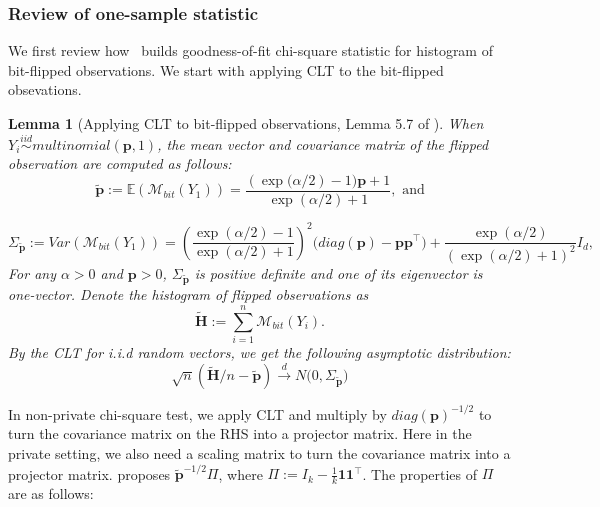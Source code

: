 \documentclass[11pt]{article} %
\newtheorem{lemma}{Lemma}[section]
\begin{document}
\subsubsection{Review of one-sample statistic}
We first review how~\citet{Gaboardi2018LDPChisq} builds goodness-of-fit chi-square statistic for  histogram of bit-flipped observations.
We start with applying CLT to the bit-flipped obsevations. 
\begin{lemma}[Applying CLT to bit-flipped observations, Lemma 5.7 of \cite{Gaboardi2018LDPChisq}]\label{lemma_57}
When $Y_i \stackrel{iid}{\sim} multinomial(\boldsymbol{p}, 1)$,
the mean vector and covariance matrix of the flipped observation are computed as follows: 
\begin{equation}
	\tilde{\boldsymbol{p}}:=	
	\mathbb{E}(\mathcal{M}_{bit}(Y_1))
	=
	\frac{(\exp
		\bigl(
		\alpha/2)-1
		\bigr) \boldsymbol{p}+1}{\exp(\alpha/2)+1}, \text{ and}
\end{equation}

\begin{equation}
	\Sigma_{\boldsymbol{\tilde{p}}}
	:=
	Var(\mathcal{M}_{bit}(Y_1))
	=
	\left(
	\frac{\exp(\alpha/2)-1}{\exp(\alpha/2)+1}
	\right)^2
	\bigl(
	diag(\boldsymbol{p}) - \boldsymbol{p}\boldsymbol{p}^\top
	\bigr)
	+
	\frac{\exp(\alpha/2)}{(\exp(\alpha/2)+1)^2}
	I_d,
\end{equation}
For any $\alpha >0$ and $\boldsymbol{p} >0$, $\Sigma_{\boldsymbol{\tilde{p}}}$ is positive definite  and one of its eigenvector is one-vector.
 Denote the histogram of flipped observations as
\begin{equation}
	\tilde{\boldsymbol{H}}:= \sum_{i=1}^{n} \mathcal{M}_{bit}(Y_i).
\end{equation} 
By the CLT for i.i.d random vectors, we get the following asymptotic distribution:
\begin{equation}\label{CLT_onesample_vector}
	\sqrt{n}(\tilde{\boldsymbol{H}}/n - \tilde{\boldsymbol{p}})
	\stackrel{d}{\to}
	N
	\bigl(
	0, \Sigma_{\boldsymbol{\tilde{p}}}
	\bigr)
\end{equation}
\end{lemma}
\noindent In non-private chi-square test, we apply CLT and
multiply by $diag(\boldsymbol{p})^{-1/2}$ to turn the  covariance matrix on the RHS into a projector matrix.
Here in the private setting, we also need a scaling matrix to turn the covariance matrix into a projector matrix.
\citet{Gaboardi2018LDPChisq} proposes $\tilde{\boldsymbol{p}}^{-1/2} \Pi$, where $\Pi := I_k - \frac{1}{k} \boldsymbol{1} \boldsymbol{1}^\top$. The properties of $\Pi$ are as follows:
\end{document}
